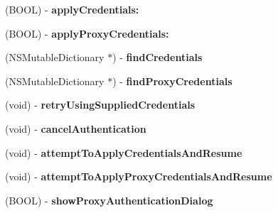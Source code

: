 \begin{DoxyCompactItemize}
\item 
\hypertarget{interface_a_s_i_h_t_t_p_request_ade60b6e81c57c8ee8b616200ccb22930}{
(\-B\-O\-O\-L) -\/ {\bfseries apply\-Credentials\-:}}
\label{interface_a_s_i_h_t_t_p_request_ade60b6e81c57c8ee8b616200ccb22930}

\item 
\hypertarget{interface_a_s_i_h_t_t_p_request_a53e09e81268eb7230b4b5498ed2eb7d1}{
(\-B\-O\-O\-L) -\/ {\bfseries apply\-Proxy\-Credentials\-:}}
\label{interface_a_s_i_h_t_t_p_request_a53e09e81268eb7230b4b5498ed2eb7d1}

\item 
\hypertarget{interface_a_s_i_h_t_t_p_request_af337cbd50189506479260c6069ca2ded}{
(\-N\-S\-Mutable\-Dictionary $\ast$) -\/ {\bfseries find\-Credentials}}
\label{interface_a_s_i_h_t_t_p_request_af337cbd50189506479260c6069ca2ded}

\item 
\hypertarget{interface_a_s_i_h_t_t_p_request_aee0699cfb5ba5749a1461dfa56440121}{
(\-N\-S\-Mutable\-Dictionary $\ast$) -\/ {\bfseries find\-Proxy\-Credentials}}
\label{interface_a_s_i_h_t_t_p_request_aee0699cfb5ba5749a1461dfa56440121}

\item 
\hypertarget{interface_a_s_i_h_t_t_p_request_aad1efa3b1bc64006cc033bd0d4eee7cc}{
(void) -\/ {\bfseries retry\-Using\-Supplied\-Credentials}}
\label{interface_a_s_i_h_t_t_p_request_aad1efa3b1bc64006cc033bd0d4eee7cc}

\item 
\hypertarget{interface_a_s_i_h_t_t_p_request_a25d3d77f917c5f8b9956f6a45022dae2}{
(void) -\/ {\bfseries cancel\-Authentication}}
\label{interface_a_s_i_h_t_t_p_request_a25d3d77f917c5f8b9956f6a45022dae2}

\item 
\hypertarget{interface_a_s_i_h_t_t_p_request_ad3da0a488faf41101bbf73a8071456e8}{
(void) -\/ {\bfseries attempt\-To\-Apply\-Credentials\-And\-Resume}}
\label{interface_a_s_i_h_t_t_p_request_ad3da0a488faf41101bbf73a8071456e8}

\item 
\hypertarget{interface_a_s_i_h_t_t_p_request_a03ce363e92c2d5dbe7229f021b0230a5}{
(void) -\/ {\bfseries attempt\-To\-Apply\-Proxy\-Credentials\-And\-Resume}}
\label{interface_a_s_i_h_t_t_p_request_a03ce363e92c2d5dbe7229f021b0230a5}

\item 
\hypertarget{interface_a_s_i_h_t_t_p_request_ad9c4b7b0abc790e74806860c6d7a7a5b}{
(\-B\-O\-O\-L) -\/ {\bfseries show\-Proxy\-Authentication\-Dialog}}
\label{interface_a_s_i_h_t_t_p_request_ad9c4b7b0abc790e74806860c6d7a7a5b}


\end{DoxyCompactItemize}
